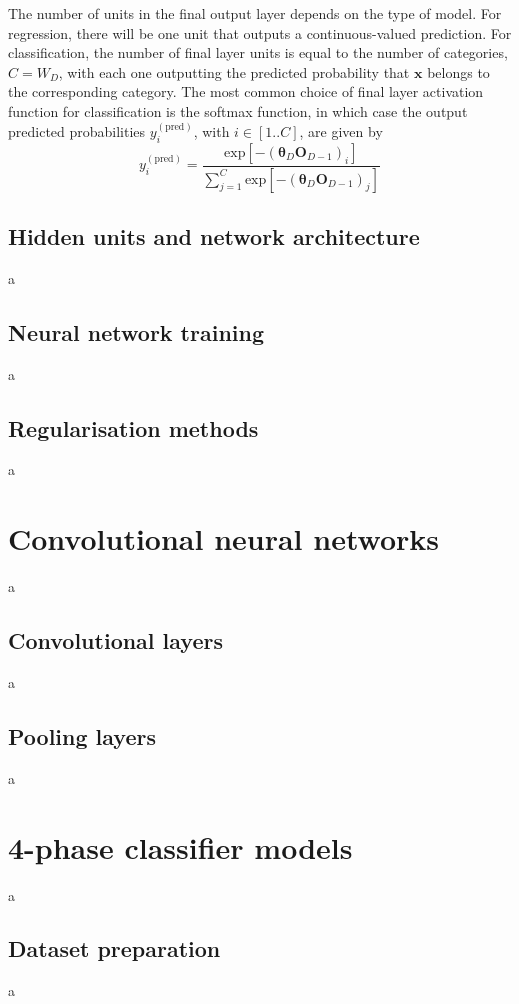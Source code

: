 \documentclass[12pt]{article}
\begin{document}
The number of units in the final output layer depends on the type of model. For regression, there will be one unit that outputs a continuous-valued prediction. For classification, the number of final layer units is equal to the number of categories, $C=W_D$,  with each one outputting the predicted probability that $\mathbf{x}$ belongs to the corresponding category. The most common choice of final layer activation function for classification is the softmax function, in which case the output predicted probabilities $y_i^{(\mathrm{pred})}$, with $i\in[1..C]$, are given by
\begin{equation}
y_i^{(\mathrm{pred})}=\frac{\mathrm{exp}\left[-\left(\boldsymbol\theta_D\mathbf{O}_{D-1}\right)_i\right]}{\sum_{j=1}^{C}\mathrm{exp}\left[-\left(\boldsymbol\theta_D\mathbf{O}_{D-1}\right)_j\right]}
\end{equation} 
\subsection{Hidden units and network architecture}
a
\subsection{Neural network training}
a
\subsection{Regularisation methods}
a
\section{Convolutional neural networks}
a
\subsection{Convolutional layers}
a
\subsection{Pooling layers}
a
\section{4-phase classifier models}
a
\subsection{Dataset preparation}
a
\end{document}

